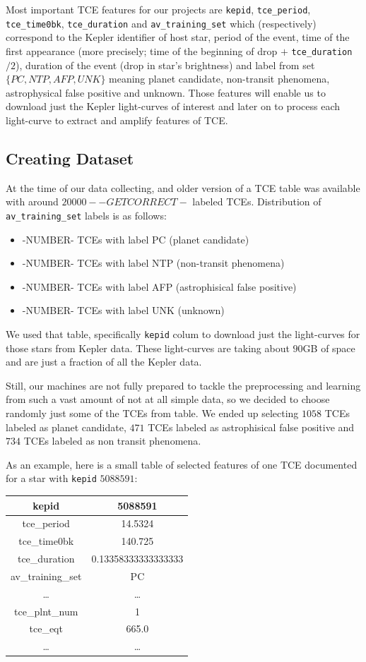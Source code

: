\documentclass[twoside]{article}
\newcommand{\code}[1]{\texttt{#1}}
\begin{document}
\begin{multicols}{2}
Most important TCE features for our projects are \code{kepid}, \code{tce\_period}, \code{tce\_time0bk}, \code{tce\_duration} and \code{av\_training\_set} which (respectively) correspond to the Kepler identifier of host star, period of the event, time of the first appearance (more precisely; time of the beginning of drop $+$ \code{tce\_duration}$/2$), duration of the event (drop in star's brightness) and label from set $\{PC,NTP,AFP,UNK\}$ meaning planet candidate, non-transit phenomena, astrophysical false positive and unknown. Those features will enable us to download just the Kepler light-curves of interest and later on to process each light-curve to extract and amplify features of TCE.

\subsection{Creating Dataset}
At the time of our data collecting, and older version of a TCE table was available with around $20000 --GETCORRECT-$ labeled TCEs. Distribution of \code{av\_training\_set} labels is as follows:
\begin{itemize}
	\item -NUMBER- TCEs with label PC (planet candidate)
    \item -NUMBER- TCEs with label NTP (non-transit phenomena)
    \item -NUMBER- TCEs with label AFP (astrophisical false positive)
    \item -NUMBER- TCEs with label UNK (unknown)
\end{itemize}
We used that table, specifically \code{kepid} colum to download just the light-curves for those stars from Kepler data. These light-curves are taking about $90$GB of space and are just a fraction of all the Kepler data.

Still, our machines are not fully prepared to tackle the preprocessing and learning from such a vast amount of not at all simple data, so we decided to choose randomly just some of the TCEs from table. We ended up selecting $1058$ TCEs labeled as planet candidate, $471$ TCEs labeled as astrophisical false positive and $734$ TCEs labeled as non transit phenomena.

As an example, here is a small table of selected features of one TCE documented for a star with \code{kepid} $5088591$:
\begin{center}
  \begin{tabular}{||c | c||} 
    \hline
    kepid & 5088591 \\
    \hline
    tce\_period & 14.5324 \\
    \hline
    tce\_time0bk & 140.725 \\
    \hline
    tce\_duration & 0.13358333333333333 \\
    \hline
    av\_training\_set & PC \\
    \hline
    \ldots & \ldots \\
    \hline
    tce\_plnt\_num & 1 \\
    \hline
    tce\_eqt & 665.0 \\
    \hline
    \ldots & \ldots
  \end{tabular}
\end{center}


\end{multicols}
\end{document}
